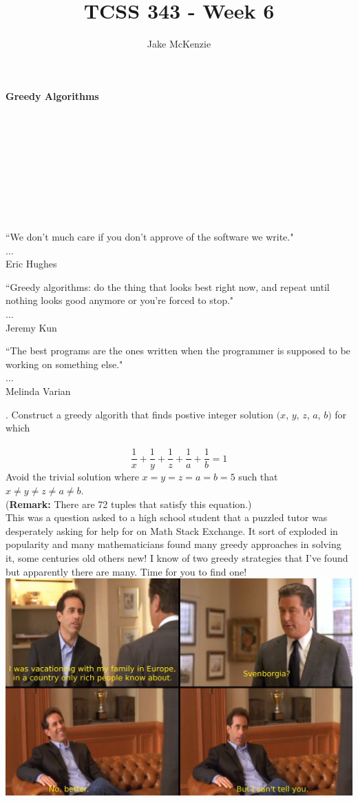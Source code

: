 \documentclass[12pt]{article}
\begin{document}
\title{TCSS 343 - Week 6}
\author{Jake McKenzie}
\maketitle
\noindent\centerline{\textbf{Greedy Algorithms}}\\\\\\\\\\\\\\\\
\begin{center}
    ``We don't much care if you don't approve of the software we write." \\$\dots$\\ Eric Hughes
\end{center}
\begin{center}
    ``Greedy algorithms: do the thing that looks best right now, and repeat until nothing looks good anymore or you're forced to stop." \\$\dots$\\ Jeremy Kun
\end{center}
\begin{center}
    ``The best programs are the ones written when the programmer is supposed to be working on something else." \\$\dots$\\ Melinda Varian
\end{center}
\newpage
{}. Construct a greedy algorith that finds postive integer solution $(x$, $y$, $z$, $a$, $b)$ for which\\\\
$$\frac{1}{x}+\frac{1}{y}+\frac{1}{z}+\frac{1}{a}+\frac{1}{b}=1$$
Avoid the trivial solution where $x=y=z=a=b=5$ such that $x\neq y \neq z \neq a \neq b$.\\
(\textbf{Remark:} There are 72 tuples that satisfy this equation.)\\
This was a question asked to a high school student that a puzzled tutor was desperately asking for help for on Math Stack Exchange.
It sort of exploded in popularity and many mathematicians found many greedy approaches in solving it, some centuries old others new!
I know of two greedy strategies that I've found but apparently there are many. Time for you to find one!
\newpage
\includegraphics[width=\textwidth]{svenborgia.jpg}\\
\end{document}
